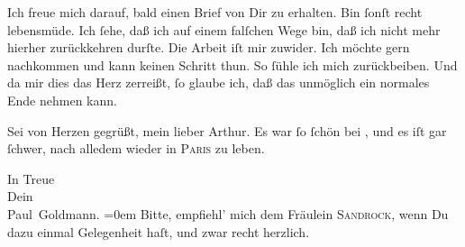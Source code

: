 \pstart
           {\pb}Ich freue mich darauf, bald einen Brief von Dir zu
               erhalten. Bin{ }ſonſt recht lebensmüde. Ich{ }ſehe, daß ich auf einem falſchen Wege bin,
               daß ich nicht mehr hierher zurückkehren durſte. Die Arbeit iſt mir zuwider. Ich
               möchte gern nachkommen und kann keinen Schritt thun. So{ }ſühle ich mich zurückbeiben.
               Und da mir dies das Herz zerreißt,{ }ſo glaube ich, daß das unmöglich ein normales Ende
               nehmen kann.\pend
           
\pstart
           {\pb}Sei von Herzen gegrüßt, mein lieber Arthur. Es war{ }ſo{ }ſchön bei \label{K_L02614-7v}\label{K_L02614-7}, und es iſt gar{ }ſchwer, nach alledem wieder in \textsc{Paris} zu leben.\pend
           
\pstart
           In Treue{\\[\baselineskip]} Dein{\\[\baselineskip]}\spacefill\mbox{Paul Goldmann.}\pend
           \leftskip=0em{}
\pstart
           \noindent{}Bitte, empfiehl’ mich dem Fräulein \textsc{Sandrock}, wenn Du dazu einmal Gelegenheit haſt, und  zwar recht herzlich.\pend
           \endnumbering{}  \newcommand{\dateiname}{L02614}\newcommand{\titel}{Paul Goldmann an Arthur Schnitzler, 21. 9. [1894]}\newcommand{\editorInnen}{Martin Anton Müller und Laura Untner}
